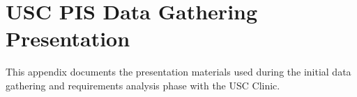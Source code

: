 
\chapter{USC PIS Data Gathering Presentation}
\label{appendix:data_gathering}

This appendix documents the presentation materials used during the initial data gathering and requirements analysis phase with the USC Clinic.


